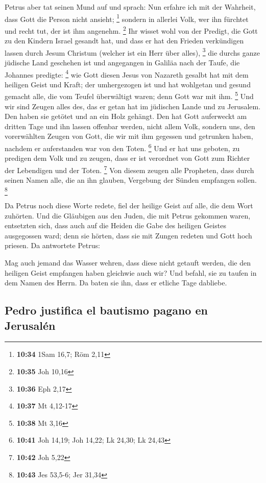  Petrus aber tat seinen Mund auf und sprach: Nun erfahre
ich mit der Wahrheit, dass Gott die Person nicht ansieht; \footnote{\textbf{10:34}
  1Sam 16,7; Röm 2,11}  sondern in allerlei Volk, wer ihn
fürchtet und recht tut, der ist ihm angenehm. \footnote{\textbf{10:35}
  Joh 10,16}  Ihr wisset wohl von der Predigt, die Gott
zu den Kindern Israel gesandt hat, und dass er hat den Frieden
verkündigen lassen durch Jesum Christum (welcher ist ein Herr über
alles), \footnote{\textbf{10:36} Eph 2,17}  die durchs
ganze jüdische Land geschehen ist und angegangen in Galiläa nach der
Taufe, die Johannes predigte: \footnote{\textbf{10:37} Mt 4,12-17}
 wie Gott diesen Jesus von Nazareth gesalbt hat mit dem
heiligen Geist und Kraft; der umhergezogen ist und hat wohlgetan und
gesund gemacht alle, die vom Teufel überwältigt waren; denn Gott war mit
ihm. \footnote{\textbf{10:38} Mt 3,16}  Und wir sind
Zeugen alles des, das er getan hat im jüdischen Lande und zu Jerusalem.
Den haben sie getötet und an ein Holz gehängt.  Den hat
Gott auferweckt am dritten Tage und ihn lassen offenbar werden,
 nicht allem Volk, sondern uns, den vorerwählten Zeugen
von Gott, die wir mit ihm gegessen und getrunken haben, nachdem er
auferstanden war von den Toten. \footnote{\textbf{10:41} Joh 14,19; Joh
  14,22; Lk 24,30; Lk 24,43}  Und er hat uns geboten, zu
predigen dem Volk und zu zeugen, dass er ist verordnet von Gott zum
Richter der Lebendigen und der Toten. \footnote{\textbf{10:42} Joh 5,22}
 Von diesem zeugen alle Propheten, dass durch seinen
Namen alle, die an ihn glauben, Vergebung der Sünden empfangen sollen.
\footnote{\textbf{10:43} Jes 53,5-6; Jer 31,34}

 Da Petrus noch diese Worte redete, fiel der heilige
Geist auf alle, die dem Wort zuhörten.  Und die Gläubigen
aus den Juden, die mit Petrus gekommen waren, entsetzten sich, dass auch
auf die Heiden die Gabe des heiligen Geistes ausgegossen ward;
 denn sie hörten, dass sie mit Zungen redeten und Gott
hoch priesen. Da antwortete Petrus:

 Mag auch jemand das Wasser wehren, dass diese nicht
getauft werden, die den heiligen Geist empfangen haben gleichwie auch
wir?  Und befahl, sie zu taufen in dem Namen des Herrn.
Da baten sie ihn, dass er etliche Tage dabliebe.

\hypertarget{pedro-justifica-el-bautismo-pagano-en-jerusaluxe9n}{%
\subsection{Pedro justifica el bautismo pagano en
Jerusalén}\label{pedro-justifica-el-bautismo-pagano-en-jerusaluxe9n}}

